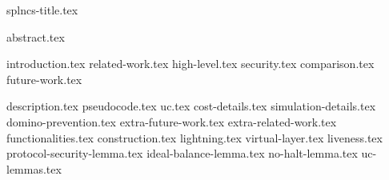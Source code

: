 \documentclass{llncs}
\begin{document}
\pagestyle{plain}
{splncs-title.tex}
\maketitle
{abstract.tex}



{introduction.tex}
{related-work.tex}
{high-level.tex}
{security.tex}
{comparison.tex}
{future-work.tex}

\makeatletter%
%
  {\appendices}%
  {\appendix}%
\makeatother%
{description.tex}
{pseudocode.tex}
{uc.tex}
{cost-details.tex}
{simulation-details.tex}
{domino-prevention.tex}
{extra-future-work.tex}
{extra-related-work.tex}
{functionalities.tex}
{construction.tex}
{lightning.tex}
{virtual-layer.tex}
{liveness.tex}
{protocol-security-lemma.tex}
{ideal-balance-lemma.tex}
{no-halt-lemma.tex}
{uc-lemmas.tex}
\end{document}
